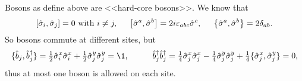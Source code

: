 Bosons as define above are <<hard-core bosons>>. We know that
\begin{equation*}
	\left[\hat{\sigma}_i,\hat{\sigma}_j\right] = 0 \ \text{with} \  i \neq j,
	\hspace{5 mm} 
	\left[\hat{\sigma}^a,\hat{\sigma}^b\right] = 2 i \varepsilon_{abc} \hat{\sigma}^c,
	\hspace{5 mm} 
	\left\{\hat{\sigma}^a,\hat{\sigma}^b\right\} = 2 \delta_{ab} .
\end{equation*}
So bosons commute at different sites, but 
\begin{equation*}
	\{\hat{b}_j,\hat{b}_j\D\} = \tfrac{1}{2} \hat{\sigma}^x_i \hat{\sigma}^x_i +  \tfrac{1}{2} \hat{\sigma}^y_j \hat{\sigma}^y_j  = \1,
	\hspace{10 mm} 
	\hat{b}_j\D \hat{b}_j\D = \tfrac{1}{4}\hat{\sigma}_j^x \hat{\sigma}_j^x-\tfrac{1}{4}\hat{\sigma}_j^y \hat{\sigma}_j^y + \tfrac{1}{4}\{\hat{\sigma}_j^x, \hat{\sigma}_j^y\} = 0,
\end{equation*}
thus at most one boson is allowed on each site.
